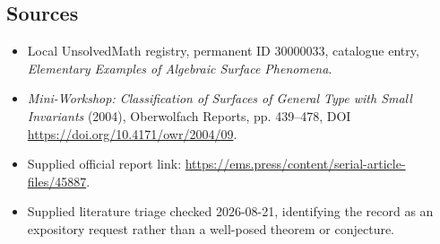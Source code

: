 \documentclass[11pt]{article}
\begin{document}
\subsection{Sources}
\begin{itemize}
\item Local UnsolvedMath registry, permanent ID 30000033, catalogue entry, \emph{Elementary Examples of Algebraic Surface Phenomena}.
\item \emph{Mini-Workshop: Classification of Surfaces of General Type with Small Invariants} (2004), Oberwolfach Reports, pp. 439--478, DOI \url{https://doi.org/10.4171/owr/2004/09}.
\item Supplied official report link: \url{https://ems.press/content/serial-article-files/45887}.
\item Supplied literature triage checked 2026-08-21, identifying the record as an expository request rather than a well-posed theorem or conjecture.
\end{itemize}
\end{document}

